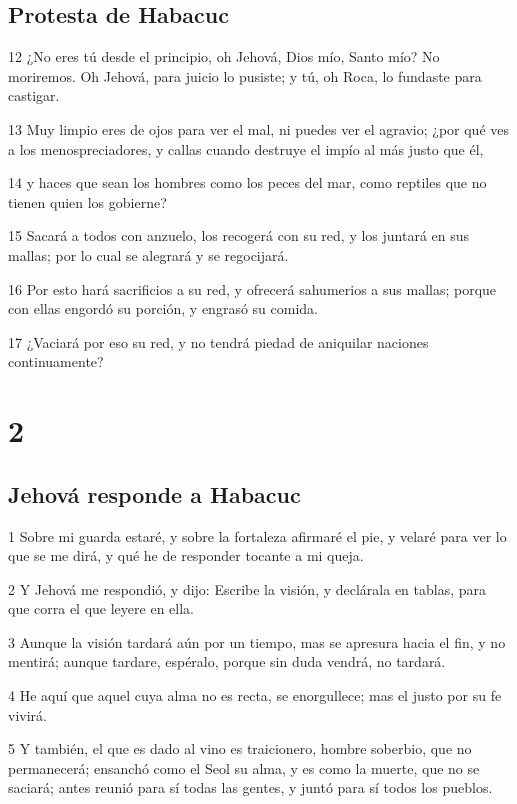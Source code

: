 \section*{Protesta de Habacuc}

\par 12 ¿No eres tú desde el principio, oh Jehová, Dios mío, Santo mío? No moriremos. Oh Jehová, para juicio lo pusiste; y tú, oh Roca, lo fundaste para castigar.
\par 13 Muy limpio eres de ojos para ver el mal, ni puedes ver el agravio; ¿por qué ves a los menospreciadores, y callas cuando destruye el impío al más justo que él,
\par 14 y haces que sean los hombres como los peces del mar, como reptiles que no tienen quien los gobierne?
\par 15 Sacará a todos con anzuelo, los recogerá con su red, y los juntará en sus mallas; por lo cual se alegrará y se regocijará.
\par 16 Por esto hará sacrificios a su red, y ofrecerá sahumerios a sus mallas; porque con ellas engordó su porción, y engrasó su comida.
\par 17 ¿Vaciará por eso su red, y no tendrá piedad de aniquilar naciones continuamente?

\chapter{2}

\section*{Jehová responde a Habacuc}

\par 1 Sobre mi guarda estaré, y sobre la fortaleza afirmaré el pie, y velaré para ver lo que se me dirá, y qué he de responder tocante a mi queja.
\par 2 Y Jehová me respondió, y dijo: Escribe la visión, y declárala en tablas, para que corra el que leyere en ella.
\par 3 Aunque la visión tardará aún por un tiempo, mas se apresura hacia el fin, y no mentirá; aunque tardare, espéralo, porque sin duda vendrá, no tardará. 
\par 4 He aquí que aquel cuya alma no es recta, se enorgullece; mas el justo por su fe vivirá. 
\par 5 Y también, el que es dado al vino es traicionero, hombre soberbio, que no permanecerá; ensanchó como el Seol su alma, y es como la muerte, que no se saciará; antes reunió para sí todas las gentes, y juntó para sí todos los pueblos.

